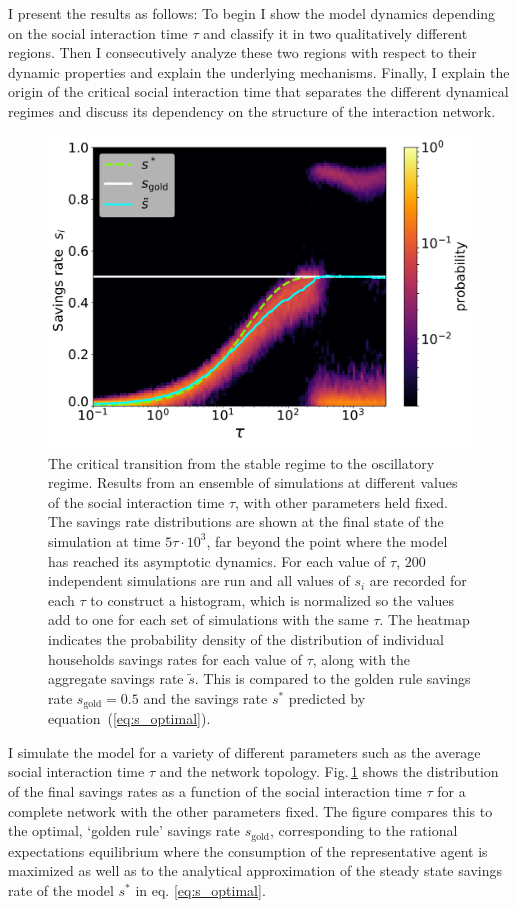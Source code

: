 I present the results as follows: To begin I show the model dynamics depending on the social interaction time $\tau$ and classify it in two qualitatively different regions. Then I consecutively analyze these two regions with respect to their dynamic properties and explain the underlying mechanisms. Finally, I explain the origin of the critical social interaction time that separates the different dynamical regimes and discuss its dependency on the structure of the interaction network.\\
\begin{figure}[ht]
     \centering
     \vspace{-.2 cm}
     \includegraphics[width=.9\linewidth]{figures/fig1.pdf}
	\caption []{{ The critical transition from the stable regime to the oscillatory regime.} 
	 Results from an ensemble of simulations at different values of the social interaction time $\tau$, with other parameters held fixed. The savings rate distributions are shown at the final state of the simulation at time $5\tau \cdot 10^3$, far beyond the point where the model has reached its asymptotic dynamics. For each value of $\tau$, $200$ independent simulations are run and all values of $s_i$ are recorded for each $\tau$ to construct a histogram, which is normalized so  the values add to one for each set of simulations with the same $\tau$.
 The heatmap indicates the probability density of the distribution of individual households savings rates for each value of $\tau$, along with the aggregate savings rate $\tilde{s}$. This is compared to the golden rule savings rate $s_\mathrm{gold} \! = 0.5$ and the savings rate $s^*$ predicted by equation~(\ref{eq:s_optimal}).}
	
   \label{phase}
\end{figure}
I simulate the model for a variety of different parameters such as the average social interaction time $\tau$ and the network topology. Fig.\,\ref{phase} shows the distribution of the final savings rates as a function of the social interaction time $\tau$ for a complete network with the other parameters fixed.  The figure compares this to the optimal, `golden rule' savings rate $s_\mathrm{gold}$,  corresponding to the rational expectations equilibrium where the consumption of the representative agent is maximized as well as to the analytical approximation of the steady state savings rate of the model $s^*$ in eq. \eqref{eq:s_optimal}.\\


